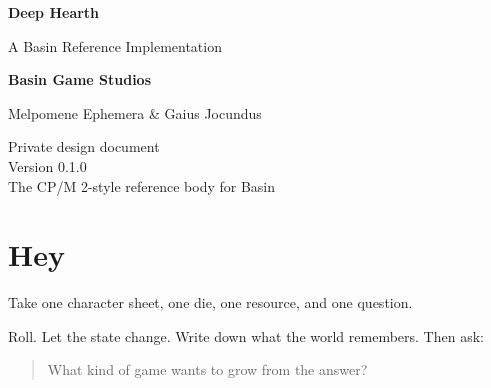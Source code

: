 \documentclass[12pt, oneside, openany]{book}
\begin{document}
\begin{titlepage}
  \thispagestyle{empty}
  \begin{center}
    \vspace*{2cm}
    {\Huge\bfseries Deep Hearth}

    \vspace{0.7cm}
    {\Large A Basin Reference Implementation}

    \vspace{0.9cm}
    {\large\bfseries Basin Game Studios}

    \vspace{1.5cm}
    {\large Melpomene Ephemera \& Gaius Jocundus}

    \vfill
    {\large Private design document\\[0.4em]
    \normalsize Version 0.1.0\\[0.4em]
    \small The CP/M 2-style reference body for Basin}
  \end{center}
\end{titlepage}

\frontmatter
\tableofcontents
\clearpage

\mainmatter







































\backmatter
\chapter*{Hey}

Take one character sheet, one die, one resource, and one question.

Roll. Let the state change. Write down what the world remembers. Then ask:

\begin{quote}
What kind of game wants to grow from the answer?
\end{quote}
\end{document}
